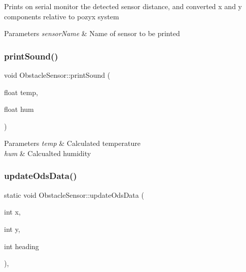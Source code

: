 Prints on serial monitor the detected sensor distance, and converted x and y components relative to pozyx system 
\begin{DoxyParams}{Parameters}
{\em sensor\+Name} & Name of sensor to be printed \\
\hline
\end{DoxyParams}
\mbox{\label{class_obstacle_sensor_a66ce921e669bb83fa8f23ad2bc2733ee}} 
\subsubsection{\texorpdfstring{print\+Sound()}{printSound()}}
{\footnotesize\ttfamily void Obstacle\+Sensor\+::print\+Sound (\begin{DoxyParamCaption}\item[{float}]{temp,  }\item[{float}]{hum }\end{DoxyParamCaption})\hspace{0.3cm}{\ttfamily [static]}}


\begin{DoxyParams}{Parameters}
{\em temp} & Calculated temperature \\
\hline
{\em hum} & Calcualted humidity \\
\hline
\end{DoxyParams}
\mbox{\label{class_obstacle_sensor_a7d7da634cf955d1890c5340336f88e28}} 
\subsubsection{\texorpdfstring{update\+Ods\+Data()}{updateOdsData()}}
{\footnotesize\ttfamily static void Obstacle\+Sensor\+::update\+Ods\+Data (\begin{DoxyParamCaption}\item[{int}]{x,  }\item[{int}]{y,  }\item[{int}]{heading }\end{DoxyParamCaption})\hspace{0.3cm}{\ttfamily [inline]}, {\ttfamily [static]}}

